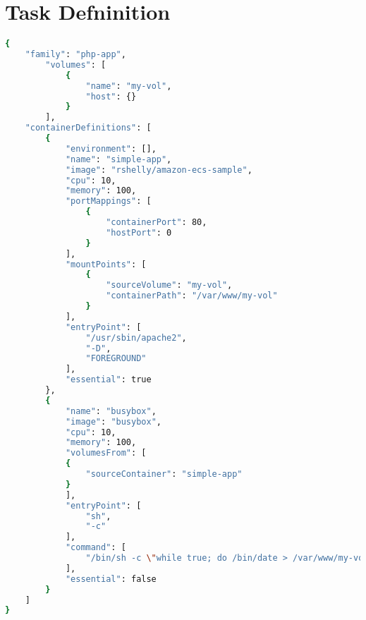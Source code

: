 \section{Task Defninition} \label{task-definition}
\begin{lstlisting}[language=bash]
{
	"family": "php-app",
		"volumes": [
			{
				"name": "my-vol",
				"host": {}
			}
		],
	"containerDefinitions": [
		{
			"environment": [],
			"name": "simple-app",
			"image": "rshelly/amazon-ecs-sample",
			"cpu": 10,
			"memory": 100,
			"portMappings": [
				{
					"containerPort": 80,
					"hostPort": 0
				}
			],
			"mountPoints": [
				{
					"sourceVolume": "my-vol",
					"containerPath": "/var/www/my-vol"
				}
			],
			"entryPoint": [
				"/usr/sbin/apache2",
				"-D",
				"FOREGROUND"
			],
			"essential": true
		},
		{
			"name": "busybox",
			"image": "busybox",
			"cpu": 10,
			"memory": 100,
			"volumesFrom": [
			{
				"sourceContainer": "simple-app"
			}
			],
			"entryPoint": [
				"sh",
				"-c"
			],
			"command": [
				"/bin/sh -c \"while true; do /bin/date > /var/www/my-vol/date; sleep 1; done\""
			],
			"essential": false
		}
	]
}

\end{lstlisting}
